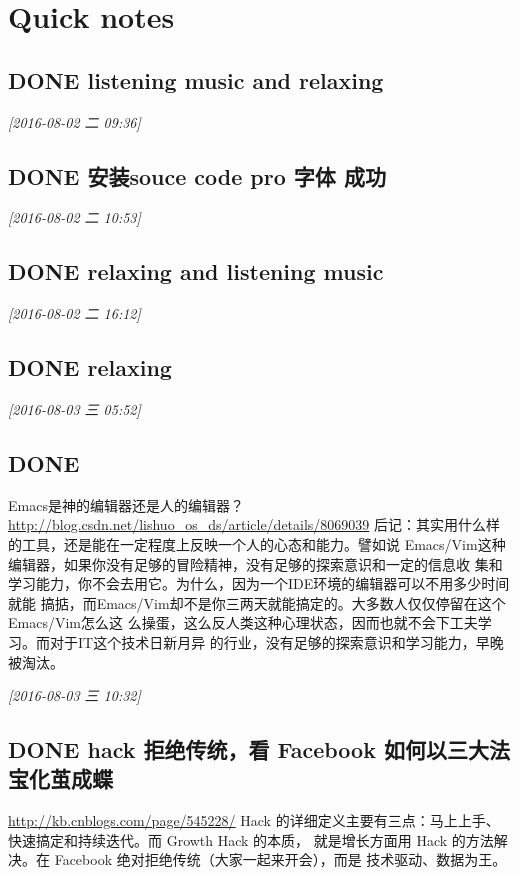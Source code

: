 \documentclass[11pt]{ctexart}
\author{mac}
\date{\today}
\title{}
\begin{document}
\tableofcontents

\section{Quick notes}
\label{sec:orgheadline70}

\subsection{{\bfseries\sffamily DONE} listening music and relaxing}
\label{sec:orgheadline1}
\textit{[2016-08-02 二 09:36]}

\subsection{{\bfseries\sffamily DONE} 安装souce code pro 字体 成功}
\label{sec:orgheadline2}
\textit{[2016-08-02 二 10:53]}

\subsection{{\bfseries\sffamily DONE} relaxing and listening music}
\label{sec:orgheadline3}
\textit{[2016-08-02 二 16:12]}

\subsection{{\bfseries\sffamily DONE} relaxing}
\label{sec:orgheadline4}
\textit{[2016-08-03 三 05:52]}

\subsection{{\bfseries\sffamily DONE} }
\label{sec:orgheadline5}
Emacs是神的编辑器还是人的编辑器？
\url{http://blog.csdn.net/lishuo_os_ds/article/details/8069039}
  后记：其实用什么样的工具，还是能在一定程度上反映一个人的心态和能力。譬如说
Emacs/Vim这种编辑器，如果你没有足够的冒险精神，没有足够的探索意识和一定的信息收
集和学习能力，你不会去用它。为什么，因为一个IDE环境的编辑器可以不用多少时间就能
搞掂，而Emacs/Vim却不是你三两天就能搞定的。大多数人仅仅停留在这个Emacs/Vim怎么这
么操蛋，这么反人类这种心理状态，因而也就不会下工夫学习。而对于IT这个技术日新月异
的行业，没有足够的探索意识和学习能力，早晚被淘汰。



\textit{[2016-08-03 三 10:32]}

\subsection{{\bfseries\sffamily DONE} hack 拒绝传统，看 Facebook 如何以三大法宝化茧成蝶}
\label{sec:orgheadline6}
\url{http://kb.cnblogs.com/page/545228/}
Hack 的详细定义主要有三点：马上上手、快速搞定和持续迭代。而 Growth Hack 的本质，
就是增长方面用 Hack 的方法解决。在 Facebook 绝对拒绝传统（大家一起来开会），而是
技术驱动、数据为王。
\end{document}
